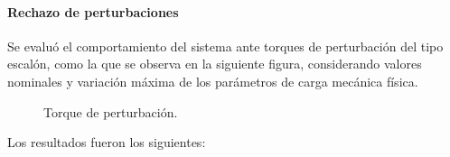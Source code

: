 \documentclass[a4paper, 10pt, onecolumn,journal]{ieeeconf}
\begin{document}
\paragraph{\textbf{Rechazo de perturbaciones}} 
Se evaluó el comportamiento del sistema ante torques de perturbación del tipo escalón, como la que se observa en la siguiente figura, considerando valores nominales y variación máxima de los parámetros de carga mecánica física.
\begin{figure}[H]
	\centering
	\begin{adjustbox}{scale=0.47,max width=\columnwidth}
	\end{adjustbox}
	\caption{Torque de perturbación.}
	\label{Torque de perturbación}
\end{figure}
Los resultados fueron los siguientes:
\end{document}
